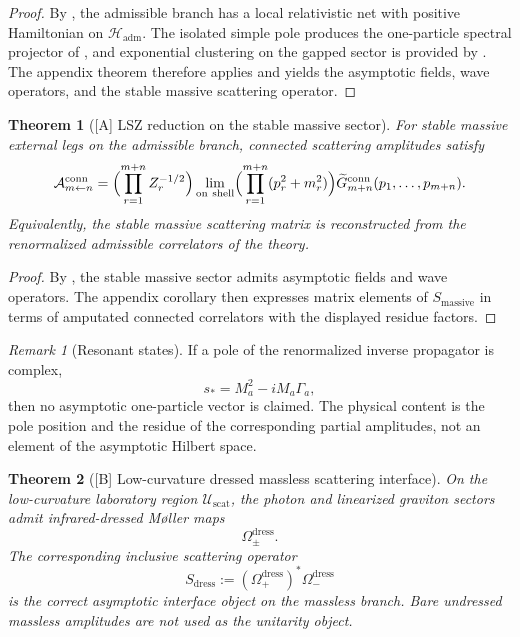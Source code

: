 \documentclass[11pt,a4paper]{article}
\newtheorem{theorem}{Theorem}[section]
\theoremstyle{definition}
\theoremstyle{remark}
\newtheorem*{remark}{Remark}
\begin{document}
\begin{proof}
By , the admissible branch
has a local relativistic net with positive Hamiltonian on $\mathcal H_{\mathrm{adm}}$. The isolated
simple pole produces the one-particle spectral projector of
, and exponential clustering on the gapped sector is
provided by . The appendix theorem
 therefore applies and yields the asymptotic fields, wave
operators, and the stable massive scattering operator.
\end{proof}

\begin{theorem}[\textnormal{[A]} LSZ reduction on the stable massive sector]
\label{thm:lsz-stable-massive}
For stable massive external legs on the admissible branch, connected scattering amplitudes satisfy
\[
\mathcal A_{m\leftarrow n}^{\mathrm{conn}}
=
\Bigl(\prod_{r=1}^{m+n} Z_r^{-1/2}\Bigr)
\lim_{\mathrm{on\ shell}}
\Bigl(\prod_{r=1}^{m+n}(p_r^2+m_r^2)\Bigr)
\widetilde G_{m+n}^{\mathrm{conn}}(p_1,\ldots,p_{m+n}).
\]
Equivalently, the stable massive scattering matrix is reconstructed from the renormalized
admissible correlators of the theory.
\end{theorem}

\begin{proof}
By , the stable massive sector admits asymptotic fields and wave
operators. The appendix corollary  then expresses matrix elements
of $S_{\mathrm{massive}}$ in terms of amputated connected correlators with the displayed residue
factors.
\end{proof}

\begin{remark}[Resonant states]
\label{rem:resonant-states-admissible}
If a pole of the renormalized inverse propagator is complex,
\[
s_\ast=M_a^2-iM_a\Gamma_a,
\]
then no asymptotic one-particle vector is claimed. The physical content is the pole position and
the residue of the corresponding partial amplitudes, not an element of the asymptotic Hilbert
space.
\end{remark}

\begin{theorem}[\textnormal{[B]} Low-curvature dressed massless scattering interface]
\label{thm:dressed-massless-interface}
\label{rem:ir-dressed-massless-sectors}
On the low-curvature laboratory region $\mathcal U_{\mathrm{scat}}$, the photon and linearized
graviton sectors admit infrared-dressed M\o ller maps
\[
\Omega_\pm^{\mathrm{dress}}.
\]
The corresponding inclusive scattering operator
\[
S_{\mathrm{dress}}:=(\Omega_+^{\mathrm{dress}})^\ast \Omega_-^{\mathrm{dress}}
\]
is the correct asymptotic interface object on the massless branch. Bare undressed massless
amplitudes are not used as the unitarity object.
\end{theorem}
\end{document}
